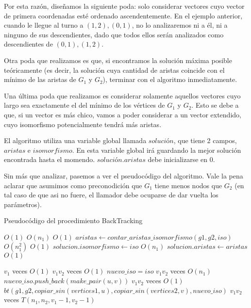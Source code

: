 Por esta razón, diseñamos la siguiente poda: solo considerar vectores cuyo vector de primera coordenadas esté ordenado ascendentemente. En el ejemplo anterior, cuando le llegue al turno a ${(1,2), (0,1)}$, no lo analizaremos ni a él, ni a ninguno de sus descendientes, dado que todos ellos serán analizados como descendientes de ${(0,1), (1,2)}$.

Otra poda que realizamos es que, si encontramos la solución máxima posible teóricamente (es decir, la solución cuya cantidad de aristas coincide con el mínimo de las aristas de $G_1$ y $G_2$), terminar con el algoritmo inmediatamente.

Una última poda que realizamos es considerar solamente aquellos vectores cuyo largo sea exactamente el del mínimo de los vértices de $G_1$ y $G_2$. Esto se debe a que, si un vector es más chico, vamos a poder considerar a un vector extendido, cuyo isomorfismo potencialmente tendrá más aristas.

El algoritmo utiliza una variable global llamada $solución$, que tiene 2 campos, $aristas$ e $isomorfismo$. En esta variable global irá guardando la mejor solución encontrada hasta el momendo. $solución.aristas$ debe inicializarse en 0.

Sin más que analizar, pasemos a ver el pseudocódigo del algoritmo. Vale la pena aclarar que asumimos como preconodición que $G_1$ tiene menos nodos que $G_2$ (en tal caso de que asi no fuere, el llamador debe ocuparse de dar vuelta los parámetros).


\begin{algorithm}[H]
  \begin{algorithmic}[1]
  \caption{Pseudocódigo del procedimiento BackTracking}
  \label{algo:2-1}
        \Comment $O(1)$ 
        \State \Return
      \EndIf
        \Comment $O(n_1)$ 
        \State \Return
      \EndIf
        \Comment $O(1)$ 
        \State $aristas \gets contar\_aristas\_isomorfismo(g1, g2, iso)$
        \Comment $O(n_1^2)$ 
          \Comment $O(1)$ 
          \State $solucion.isomorfismo \gets iso$
          \Comment $O(n_1)$ 
          \State $solucion.aristas \gets aristas$
          \Comment $O(1)$ 
        \EndIf
        \State \Return
      \EndIf
      
        \Comment $v_1$ veces $O(1)$ 
          \Comment $v_1 v_2$ veces $O(1)$ 
          \State $nuevo\_iso = iso$
          \Comment $v_1 v_2$ veces $O(n_1)$ 
          \State $nuevo\_iso.push\_back(make\_pair(u,v))$
          \Comment $v_1 v_2$ veces $O(1)$ 
          \State $bt(g1, g2, copiar\_sin(vertices1, u), copiar\_sin(vertices2, v), nuevo\_iso)$
          \Comment $v_1 v_2$ veces $T(n_1, n_2, v_1 - 1, v_2 - 1)$
        \EndFor
      \EndFor
		\EndProcedure
	\end{algorithmic}
\end{algorithm}



